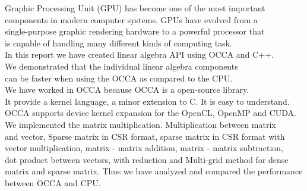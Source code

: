 \documentclass[a4paper, 8pt, oneside]{Thesis}  %
\begin{document}
\clearpage  %
\lhead{\emph{}}  %
{
Graphic Processing Unit (GPU) has become one of the most important \\components in modern computer systems. GPUs have evolved from  a\\ single-purpose graphic rendering hardware to a powerful processor that\\ is capable of handling many different kinds of computing task.\\

In this report we have created linear algebra API using OCCA and C++.\\ We demonstrated that the individual linear algebra components \\can be faster when using the OCCA as compared to the CPU.\\
We have worked in OCCA because OCCA is a open-source library. \\It provide a kernel language, a minor extension to C. It is easy to understand.\\ OCCA supports device kernel expansion for the OpenCL, OpenMP and CUDA.\\ 

We implemented the matrix multiplication. Multiplication between matrix\\ and vector, Sparse matrix in CSR format, sparse matrix in CSR format with\\ vector multiplication, matrix - matrix addition, matrix - matrix subtraction,\\ dot product between vectors, with reduction and Multi-grid method for dense\\ matrix and sparse matrix. Thus we have analyzed and compared the performance\\ between OCCA and CPU.
}

\mainmatter	  %
\pagestyle{fancy}  %

\end{document}
